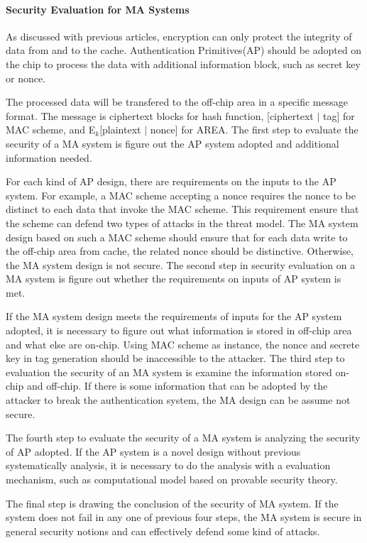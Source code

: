 \documentclass{article}
\begin{document}
\paragraph{Security Evaluation for MA Systems}
As discussed with previous articles, encryption can only protect the integrity of data from and to the cache. Authentication Primitives(AP) should be adopted on the chip to process the data with additional information block, such as secret key or nonce. 

The processed data will be transfered to the off-chip area in a specific message format. The message is ciphertext blocks for hash function, [ciphertext $\mid$ tag] for MAC scheme, and E$_k$[plaintext $\mid$ nonce] for AREA. The first step to evaluate the security of a MA system is figure out the AP system adopted and additional information needed. 

For each kind of AP design, there are requirements on the inputs to the AP system. For example, a MAC scheme accepting a nonce requires the nonce to be distinct to each data that invoke the MAC scheme. This requirement ensure that the scheme can defend two types of attacks in the threat model. The MA system design based on such a MAC scheme should ensure that for each data write to the off-chip area from cache, the related nonce should be distinctive. Otherwise, the MA system design is not secure. The second step in security evaluation on a MA system is figure out whether the requirements on inputs of AP system is met.

If the MA system design meets the requirements of inputs for the AP system adopted, it is necessary to figure out what information is stored in off-chip area and what else are on-chip. Using MAC scheme as instance, the nonce and secrete key in tag generation should be inaccessible to the attacker.  
The third step to evaluation the security of an MA system is examine the information stored on-chip and off-chip. If there is some information that can be adopted by the attacker to break the authentication system, the MA design can be assume not secure.

The fourth step to evaluate the security of a MA system is analyzing the security of AP adopted. If the AP system is a novel design without previous systematically analysis, it is necessary to do the analysis with a evaluation mechanism, such as computational model based on provable security theory.

The final step is drawing the conclusion of the security of MA system. If the system does not fail in any one of previous four steps, the MA system is secure in general security notions and can effectively defend some kind of attacks.
 
\end{document}
